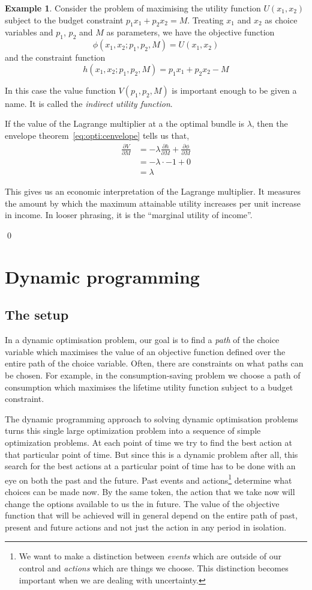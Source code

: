 \documentclass[12pt,reqno,openany]{amsbook}
\theoremstyle{plain}
\theoremstyle{definition}
\newtheorem{exmp}{Example}[chapter]
\begin{document}
\begin{exmp}
Consider the problem of maximising the utility function $U(x_1,x_2)$
subject to the budget constraint $p_1x_1+p_2x_2=M$. Treating $x_1$ and
$x_2$ as choice variables and $p_1$, $p_2$ and $M$ as parameters, we
have the objective function
\[\phi(x_1,x_2;p_1,p_2,M) = U(x_1,x_2)\]
and the constraint function
\[h(x_1,x_2;p_1,p_2,M)=p_1x_1+p_2x_2-M\]

In this case the value function $V(p_1,p_2,M)$ is important enough to
be given a name. It is called the \emph{indirect utility function}.

If the value of the Lagrange multiplier at a the optimal bundle is
$\lambda$, then the envelope theorem~\eqref{eq:opti:cenvelope} tells
us that,
\begin{align*}
\frac{\partial V}{\partial M}&=
-\lambda\frac{\partial h}{\partial  M}
+\frac{\partial \phi}{\partial M}\\
&=-\lambda \cdot -1+0\\
&=\lambda
\end{align*}

This gives us an economic interpretation of the Lagrange multiplier.
It measures the amount by which the maximum attainable utility
increases per unit increase in income. In looser phrasing, it is the
``marginal utility of income''.

\qed
\end{exmp}

\chapter{Dynamic programming}
\section{The setup}
In a dynamic optimisation problem, our goal is to find a \emph{path}
of the choice variable which maximises the value of an objective
function defined over the entire path of the choice variable. Often,
there are constraints on what paths can be chosen. For example, in the
consumption-saving problem we choose a path of consumption which
maximises the lifetime utility function subject to a budget
constraint.

The dynamic programming approach to solving dynamic optimisation
problems  turns this single large optimization problem into a
sequence of simple optimization problems. At each point of time we try
to find the best action at that particular point of time. But since
this is a dynamic problem after all, this search for the best actions
at a particular point of time has to be done with an eye on both the
past and the future. Past events and actions\footnote{We want to make
  a distinction between \emph{events} which are outside of our control
  and \emph{actions} which are things we choose. This distinction
  becomes important when we are dealing with uncertainty.} determine what choices can be made now. By the
same token, the action that we take now will change the options
available to us the in future. The value of the objective function
that will be achieved will in general depend on the entire path of
past, present and future actions and not just the action in any period in
isolation.
\end{document}
